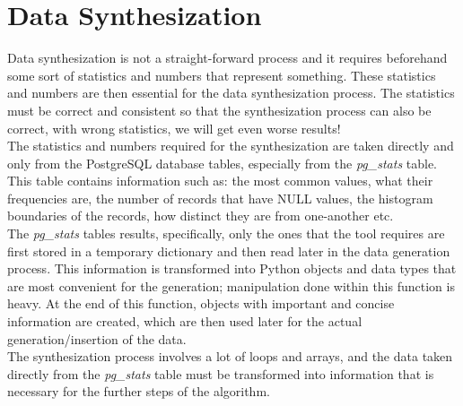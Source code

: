 \section{Data Synthesization}
Data synthesization is not a straight-forward process and it requires beforehand some sort of statistics and numbers that represent something. These statistics and numbers are then essential for the data synthesization process. The statistics must be correct and consistent so that the synthesization process can also be correct, with wrong statistics, we will get even worse results!\\
\newline
The statistics and numbers required for the synthesization are taken directly and only from the PostgreSQL database tables, especially from the \textit{pg\_stats} table. This table contains information such as: the most common values, what their frequencies are, the number of records that have NULL values, the histogram boundaries of the records, how distinct they are from one-another etc.\\
The \textit{pg\_stats} tables results, specifically, only the ones that the tool requires are first stored in a temporary dictionary and then read later in the data generation process. This information is transformed into Python objects and data types that are most convenient for the generation; manipulation done within this function is heavy. At the end of this function, objects with important and concise information are created, which are then used later for the actual generation/insertion of the data.\\
The synthesization process involves a lot of loops and arrays, and the data taken directly from the \textit{pg\_stats} table must be transformed into  information that is necessary for the further steps of the algorithm.
